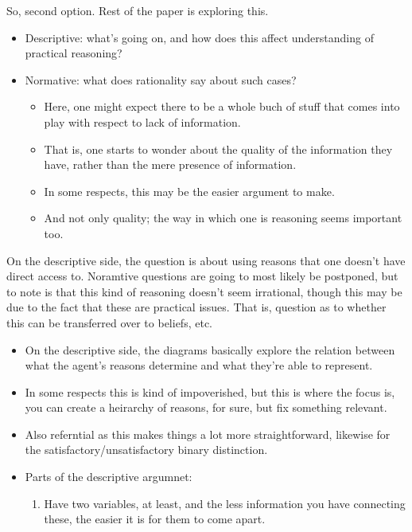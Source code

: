\documentclass[10pt]{article}
\begin{document}
So, second option.
Rest of the paper is exploring this.
\begin{itemize}
\item Descriptive: what's going on, and how does this affect understanding of practical reasoning?
\item Normative: what does rationality say about such cases?
  \begin{itemize}
  \item Here, one might expect there to be a whole buch of stuff that comes into play with respect to lack of information.
  \item That is, one starts to wonder about the quality of the information they have, rather than the mere presence of information.
  \item In some respects, this may be the easier argument to make.
  \item And not only quality; the way in which one is reasoning seems important too.
  \end{itemize}
\end{itemize}

On the descriptive side, the question is about using reasons that one doesn't have direct access to.
Noramtive questions are going to most likely be postponed, but to note is that this kind of reasoning doesn't seem irrational, though this may be due to the fact that these are practical issues.
That is, question as to whether this can be transferred over to beliefs, etc.

\begin{itemize}
\item On the descriptive side, the diagrams basically explore the relation between what the agent's reasons determine and what they're able to represent.
\item In some respects this is kind of impoverished, but this is where the focus is, you can create a heirarchy of reasons, for sure, but fix something relevant.
\item Also referntial as this makes things a lot more straightforward, likewise for the satisfactory/unsatisfactory binary distinction.
\end{itemize}


\begin{itemize}
\item Parts of the descriptive argumnet:
  \begin{enumerate}
  \item Have two variables, at least, and the less information you have connecting these, the easier it is for them to come apart.
  \end{enumerate}
\end{itemize}
\end{document}
